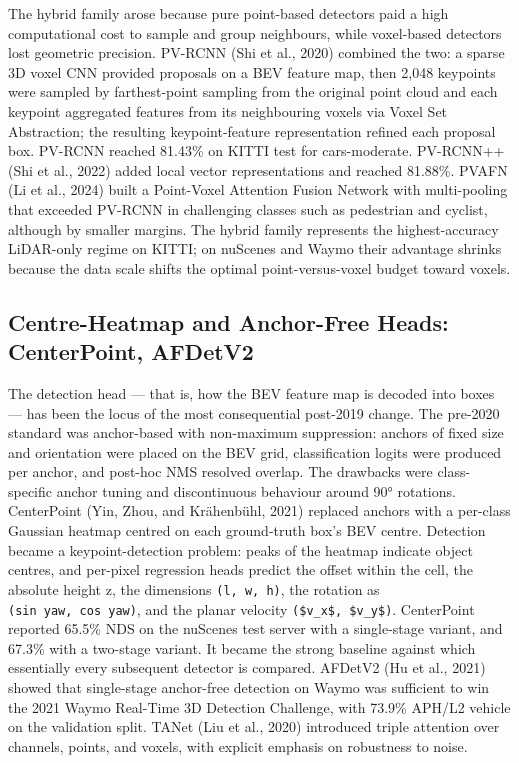 The hybrid family arose because pure point-based detectors paid a high computational cost to sample and group neighbours, while voxel-based detectors lost geometric precision. PV-RCNN (Shi et al., 2020) combined the two: a sparse 3D voxel CNN provided proposals on a BEV feature map, then 2,048 keypoints were sampled by farthest-point sampling from the original point cloud and each keypoint aggregated features from its neighbouring voxels via Voxel Set Abstraction; the resulting keypoint-feature representation refined each proposal box. PV-RCNN reached 81.43\% on KITTI test for cars-moderate. PV-RCNN++ (Shi et al., 2022) added local vector representations and reached 81.88\%. PVAFN (Li et al., 2024) built a Point-Voxel Attention Fusion Network with multi-pooling that exceeded PV-RCNN in challenging classes such as pedestrian and cyclist, although by smaller margins. The hybrid family represents the highest-accuracy LiDAR-only regime on KITTI; on nuScenes and Waymo their advantage shrinks because the data scale shifts the optimal point-versus-voxel budget toward voxels.

\subsection{Centre-Heatmap and Anchor-Free Heads: CenterPoint, AFDetV2}\label{centre-heatmap-and-anchor-free-heads-centerpoint-afdetv2}

The detection head --- that is, how the BEV feature map is decoded into boxes --- has been the locus of the most consequential post-2019 change. The pre-2020 standard was anchor-based with non-maximum suppression: anchors of fixed size and orientation were placed on the BEV grid, classification logits were produced per anchor, and post-hoc NMS resolved overlap. The drawbacks were class-specific anchor tuning and discontinuous behaviour around 90° rotations. CenterPoint (Yin, Zhou, and Krähenbühl, 2021) replaced anchors with a per-class Gaussian heatmap centred on each ground-truth box's BEV centre. Detection became a keypoint-detection problem: peaks of the heatmap indicate object centres, and per-pixel regression heads predict the offset within the cell, the absolute height z, the dimensions \texttt{(l,\ w,\ h)}, the rotation as \texttt{(sin\ yaw,\ cos\ yaw)}, and the planar velocity \texttt{(\$v\_x\$,\ \$v\_y\$)}. CenterPoint reported 65.5\% NDS on the nuScenes test server with a single-stage variant, and 67.3\% with a two-stage variant. It became the strong baseline against which essentially every subsequent detector is compared. AFDetV2 (Hu et al., 2021) showed that single-stage anchor-free detection on Waymo was sufficient to win the 2021 Waymo Real-Time 3D Detection Challenge, with 73.9\% APH/L2 vehicle on the validation split. TANet (Liu et al., 2020) introduced triple attention over channels, points, and voxels, with explicit emphasis on robustness to noise.

